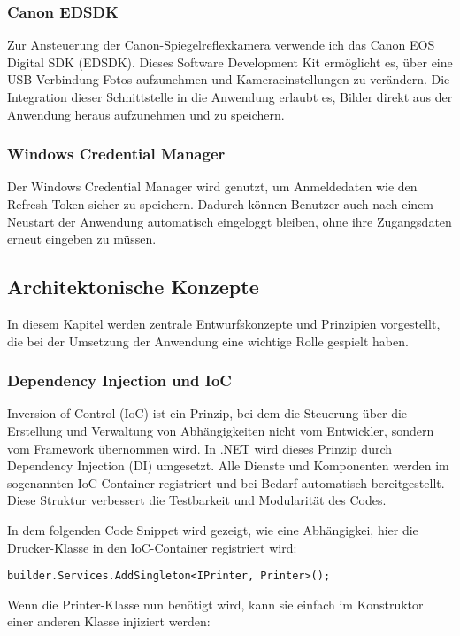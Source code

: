 \subsubsection{Canon EDSDK}
Zur Ansteuerung der Canon-Spiegelreflexkamera verwende ich das Canon EOS Digital
SDK (EDSDK). Dieses Software Development Kit ermöglicht es, über eine
USB-Verbindung Fotos aufzunehmen und Kameraeinstellungen zu verändern.
Die Integration dieser Schnittstelle in die Anwendung erlaubt es, Bilder direkt
aus der Anwendung heraus aufzunehmen und zu speichern.

\subsubsection{Windows Credential Manager}
Der Windows Credential Manager wird genutzt, um Anmeldedaten wie den Refresh-Token
sicher zu speichern. Dadurch können Benutzer auch nach einem Neustart der Anwendung
automatisch eingeloggt bleiben, ohne ihre Zugangsdaten erneut eingeben zu müssen.

\subsection{Architektonische Konzepte}

In diesem Kapitel werden zentrale Entwurfskonzepte und Prinzipien vorgestellt,
die bei der Umsetzung der Anwendung eine wichtige Rolle gespielt haben.

\subsubsection{Dependency Injection und IoC}
Inversion of Control (IoC) ist ein Prinzip, bei dem die Steuerung über
die Erstellung und Verwaltung von Abhängigkeiten nicht vom Entwickler,
sondern vom Framework übernommen wird. In .NET wird dieses Prinzip durch
Dependency Injection (DI) umgesetzt. Alle Dienste und Komponenten werden im
sogenannten IoC-Container registriert und bei Bedarf automatisch bereitgestellt.
Diese Struktur verbessert die Testbarkeit und Modularität des Codes.

In dem folgenden Code Snippet wird gezeigt, wie eine Abhängigkei, hier die 
Drucker-Klasse in den IoC-Container registriert wird:

\begin{lstlisting}
builder.Services.AddSingleton<IPrinter, Printer>();
\end{lstlisting}    

Wenn die Printer-Klasse nun benötigt wird, kann sie einfach im Konstruktor
einer anderen Klasse injiziert werden:

